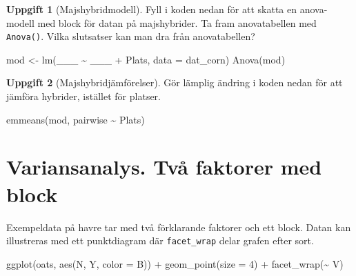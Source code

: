 \documentclass[
]{book}
\newenvironment{Shaded}{\begin{snugshade}}{\end{snugshade}}
\newcommand{\AttributeTok}[1]{\textcolor[rgb]{0.77,0.63,0.00}{#1}}
\newcommand{\DecValTok}[1]{\textcolor[rgb]{0.00,0.00,0.81}{#1}}
\newcommand{\FunctionTok}[1]{\textcolor[rgb]{0.00,0.00,0.00}{#1}}
\newcommand{\NormalTok}[1]{#1}
\newcommand{\OtherTok}[1]{\textcolor[rgb]{0.56,0.35,0.01}{#1}}
\newcommand{\SpecialCharTok}[1]{\textcolor[rgb]{0.00,0.00,0.00}{#1}}
\theoremstyle{definition}
\theoremstyle{definition}
\theoremstyle{definition}
\newtheorem{exercise}{Uppgift}[chapter]
\theoremstyle{definition}
\theoremstyle{remark}
\begin{document}
\begin{exercise}[Majshybridmodell]

Fyll i koden nedan för att skatta en anova-modell med block för datan på majshybrider. Ta fram anovatabellen med \texttt{Anova()}. Vilka slutsatser kan man dra från anovatabellen?

\begin{Shaded}
\begin{Highlighting}[]
\NormalTok{mod }\OtherTok{\textless{}{-}} \FunctionTok{lm}\NormalTok{(\_\_\_ }\SpecialCharTok{\textasciitilde{}}\NormalTok{ \_\_\_ }\SpecialCharTok{+}\NormalTok{ Plats, }\AttributeTok{data =}\NormalTok{ dat\_corn)}
\FunctionTok{Anova}\NormalTok{(mod)}
\end{Highlighting}
\end{Shaded}

\end{exercise}

\begin{exercise}[Majshybridjämförelser]

Gör lämplig ändring i koden nedan för att jämföra hybrider, istället för platser.

\begin{Shaded}
\begin{Highlighting}[]
\FunctionTok{emmeans}\NormalTok{(mod, pairwise }\SpecialCharTok{\textasciitilde{}}\NormalTok{ Plats)}
\end{Highlighting}
\end{Shaded}

\end{exercise}

\hypertarget{variansanalys.-tvuxe5-faktorer-med-block}{%
\section{Variansanalys. Två faktorer med block}\label{variansanalys.-tvuxe5-faktorer-med-block}}

Exempeldata på havre tar med två förklarande faktorer och ett block. Datan kan illustreras med ett punktdiagram där \texttt{facet\_wrap} delar grafen efter sort.

\begin{Shaded}
\begin{Highlighting}[]
\FunctionTok{ggplot}\NormalTok{(oats, }\FunctionTok{aes}\NormalTok{(N, Y, }\AttributeTok{color =}\NormalTok{ B)) }\SpecialCharTok{+}
  \FunctionTok{geom\_point}\NormalTok{(}\AttributeTok{size =} \DecValTok{4}\NormalTok{) }\SpecialCharTok{+}
  \FunctionTok{facet\_wrap}\NormalTok{(}\SpecialCharTok{\textasciitilde{}}\NormalTok{ V)}
\end{Highlighting}
\end{Shaded}
\end{document}
